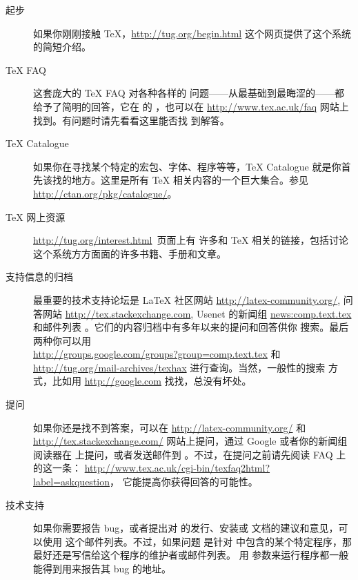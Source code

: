 \documentclass{article}
\begin{document}
\begin{description}
\item [起步] 如果你刚刚接触 \TeX，\url{http://tug.org/begin.html}
这个网页提供了这个系统的简短介绍。

\item [\TeX{} FAQ] 这套庞大的 \TeX{} FAQ 对各种各样的
问题——从最基础到最晦涩的——都给予了简明的回答，它在 \TL{} 的
，也可以在
\url{http://www.tex.ac.uk/faq} 网站上找到。有问题时请先看看这里能否找
到解答。

\item [\TeX{} Catalogue] 如果你在寻找某个特定的宏包、字体、程序等等，\TeX{}
Catalogue 就是你首先该找的地方。这里是所有 \TeX{} 相关内容的一个巨大集合。参见
\url{http://ctan.org/pkg/catalogue/}。

\item [\TeX{} 网上资源] \url{http://tug.org/interest.html}~页面上有
许多和 \TeX{} 相关的链接，包括讨论这个系统方方面面的许多书籍、手册和文章。

\item [支持信息的归档] 最重要的技术支持论坛是
\LaTeX{} 社区网站 \url{http://latex-community.org/}, 问答网站
\url{http://tex.stackexchange.com}, Usenet 的新闻组 \url{news:comp.text.tex}
和邮件列表 。它们的内容归档中有多年以来的提问和回答供你
搜索。最后两种你可以用 \\
\url{http://groups.google.com/groups?group=comp.text.tex} 和 \\
\url{http://tug.org/mail-archives/texhax} 进行查询。当然，一般性的搜索
方式，比如用 \url{http://google.com} 找找，总没有坏处。

\item [提问] 如果你还是找不到答案，可以在 \url{http://latex-community.org/} 和
\url{http://tex.stackexchange.com/} 网站上提问，通过 Google
或者你的新闻组阅读器在  上提问，或者发送邮件到
。不过，在提问之前请先阅读 FAQ 上的这一条：
\url{http://www.tex.ac.uk/cgi-bin/texfaq2html?label=askquestion}，
它能提高你获得回答的可能性。

\item [\TL{} 技术支持] 如果你需要报告 bug，或者提出对 \TL{} 的发行、安装或
文档的建议和意见，可以使用  这个邮件列表。不过，如果问题
是针对 \TL{} 中包含的某个特定程序，那最好还是写信给这个程序的维护者或邮件列表。
用  参数来运行程序都一般能得到用来报告其 bug 的地址。

\end{description}
\end{document}
